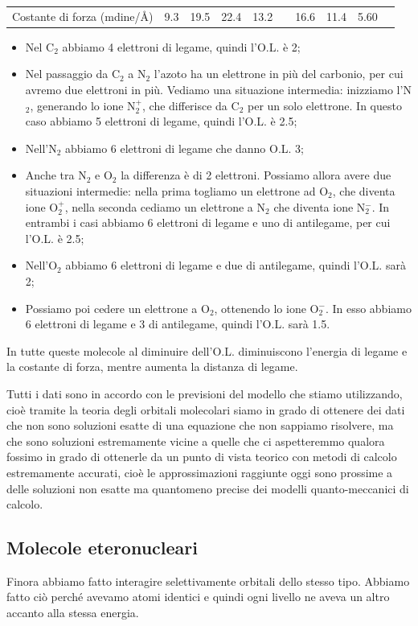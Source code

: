\begin{center}
\begin{tabular}{ m{3cm}m{1cm}m{1cm}m{1cm}m{1cm}|m{1cm}m{1cm}m{1cm}m{1cm}m{1cm}}
        \vspace{0.2cm}Costante di forza (mdine/Å) & 9.3 & 19.5 & 22.4 & 13.2 & & 16.6 & 11.4 & 5.60
    \end{tabular}
\end{center}

\begin{itemize}
    \item Nel C$_2$ abbiamo 4 elettroni di legame, quindi l'O.L. è 2;
    \item Nel passaggio da C$_2$ a N$_2$ l'azoto ha un elettrone in più del carbonio, per cui avremo due elettroni in più. Vediamo una situazione intermedia: inizziamo l'N$_2$, generando lo ione N$_2^+$, che differisce da C$_2$ per un solo elettrone. In questo caso abbiamo 5 elettroni di legame, quindi l'O.L. è 2.5;
    \item Nell'N$_2$ abbiamo 6 elettroni di legame che danno O.L. 3;
    \item Anche tra N$_2$ e O$_2$ la differenza è di 2 elettroni. Possiamo allora avere due situazioni intermedie: nella prima togliamo un elettrone ad O$_2$, che diventa ione O$_2^+$, nella seconda cediamo un elettrone a N$_2$ che diventa ione N$_2^-$. In entrambi i casi abbiamo 6 elettroni di legame e uno di antilegame, per cui l'O.L. è 2.5;
    \item Nell'O$_2$ abbiamo 6 elettroni di legame e due di antilegame, quindi l'O.L. sarà 2;
    \item Possiamo poi cedere un elettrone a O$_2$, ottenendo lo ione O$_2^-$. In esso abbiamo 6 elettroni di legame e 3 di antilegame, quindi l'O.L. sarà 1.5.
\end{itemize}

In tutte queste molecole al diminuire dell'O.L. diminuiscono l'energia di legame e la costante di forza, mentre aumenta la distanza di legame.

Tutti i dati sono in accordo con le previsioni del modello che stiamo utilizzando, cioè tramite la teoria degli orbitali molecolari siamo in grado di ottenere dei dati che non sono soluzioni esatte di una equazione che non sappiamo risolvere, ma che sono soluzioni estremamente vicine a quelle che ci aspetteremmo qualora fossimo in grado di ottenerle da un punto di vista teorico con metodi di calcolo estremamente accurati, cioè le approssimazioni raggiunte oggi sono prossime a delle soluzioni non esatte ma quantomeno precise dei modelli quanto-meccanici di calcolo.

\subsection{Molecole eteronucleari}
Finora abbiamo fatto interagire selettivamente orbitali dello stesso tipo. Abbiamo fatto ciò perché avevamo atomi identici e quindi ogni livello ne aveva un altro accanto alla stessa energia.

